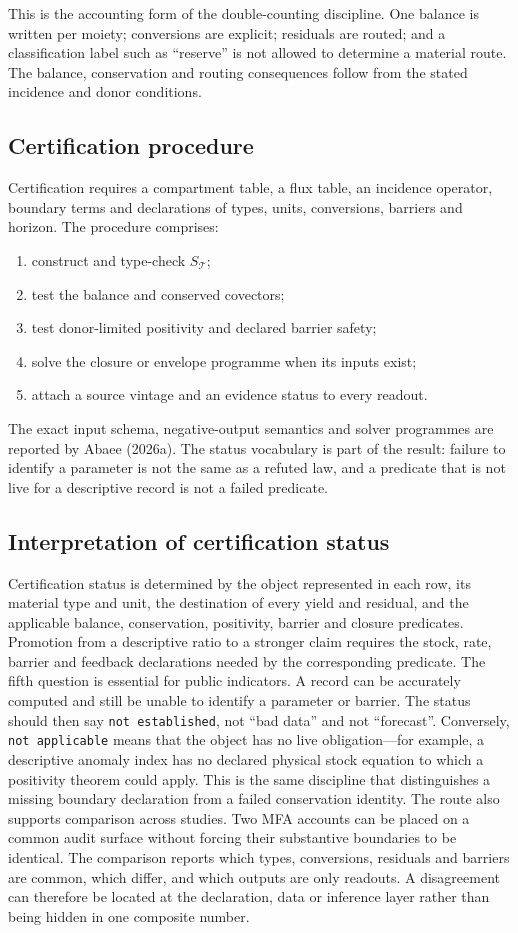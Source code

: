 \documentclass[11pt]{article}
\begin{document}
This is the accounting form of the double-counting discipline. One balance is written per moiety; conversions are explicit; residuals are routed; and a classification label such as ``reserve'' is not allowed to determine a material route. The balance, conservation and routing consequences follow from the stated incidence and donor conditions.
\subsection{Certification procedure}
Certification requires a compartment table, a flux table, an incidence operator, boundary terms and declarations of types, units, conversions, barriers and horizon. The procedure comprises:
\begin{enumerate}
\item construct and type-check \(S_{\mathcal T}\);
\item test the balance and conserved covectors;
\item test donor-limited positivity and declared barrier safety;
\item solve the closure or envelope programme when its inputs exist;
\item attach a source vintage and an evidence status to every readout.
\end{enumerate}
The exact input schema, negative-output semantics and solver programmes are reported by Abaee (2026a). The status vocabulary is part of the result: failure to identify a parameter is not the same as a refuted law, and a predicate that is not live for a descriptive record is not a failed predicate.
\subsection{Interpretation of certification status}
Certification status is determined by the object represented in each row, its material type and unit, the destination of every yield and residual, and the applicable balance, conservation, positivity, barrier and closure predicates. Promotion from a descriptive ratio to a stronger claim requires the stock, rate, barrier and feedback declarations needed by the corresponding predicate.
The fifth question is essential for public indicators. A record can be accurately computed and still be unable to identify a parameter or barrier. The status should then say \texttt{not established}, not ``bad data'' and not ``forecast''. Conversely, \texttt{not applicable} means that the object has no live obligation---for example, a descriptive anomaly index has no declared physical stock equation to which a positivity theorem could apply. This is the same discipline that distinguishes a missing boundary declaration from a failed conservation identity.
The route also supports comparison across studies. Two MFA accounts can be placed on a common audit surface without forcing their substantive boundaries to be identical. The comparison reports which types, conversions, residuals and barriers are common, which differ, and which outputs are only readouts. A disagreement can therefore be located at the declaration, data or inference layer rather than being hidden in one composite number.
\end{document}
